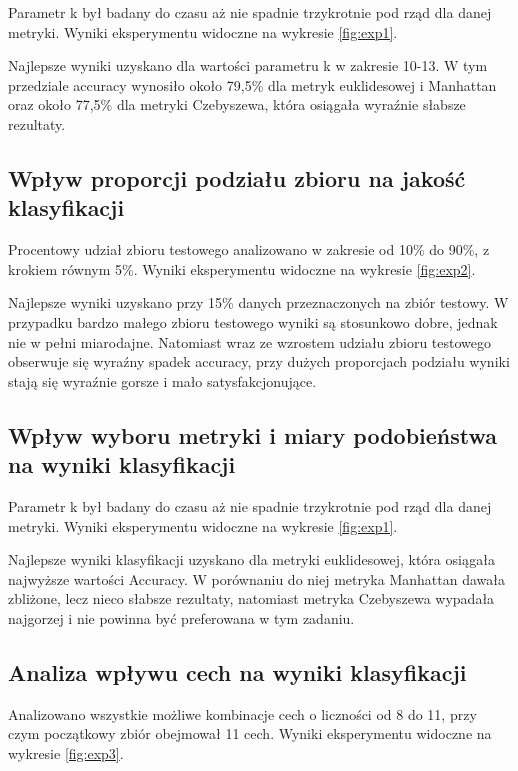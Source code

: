 \documentclass{article}
\begin{document}
	Parametr k był badany do czasu aż nie spadnie trzykrotnie pod rząd dla danej metryki.
	Wyniki eksperymentu widoczne na wykresie \ref{fig:exp1}.

	Najlepsze wyniki uzyskano dla wartości parametru k w zakresie 10-13. W tym przedziale accuracy wynosiło około 79,5\% dla metryk euklidesowej i Manhattan oraz około 77,5\% dla metryki Czebyszewa, która osiągała wyraźnie słabsze rezultaty.

	\subsection{Wpływ proporcji podziału zbioru na jakość klasyfikacji}

	Procentowy udział zbioru testowego analizowano w zakresie od 10\% do 90\%, z krokiem równym 5\%.
	Wyniki eksperymentu widoczne na wykresie \ref{fig:exp2}.

	Najlepsze wyniki uzyskano przy 15\% danych przeznaczonych na zbiór testowy. W przypadku bardzo małego zbioru testowego wyniki są stosunkowo dobre, jednak nie w pełni miarodajne. Natomiast wraz ze wzrostem udziału zbioru testowego obserwuje się wyraźny spadek accuracy, przy dużych proporcjach podziału wyniki stają się wyraźnie gorsze i mało satysfakcjonujące.

	\subsection{Wpływ wyboru metryki i miary podobieństwa na wyniki klasyfikacji}

	Parametr k był badany do czasu aż nie spadnie trzykrotnie pod rząd dla danej metryki.
	Wyniki eksperymentu widoczne na wykresie \ref{fig:exp1}.

	Najlepsze wyniki klasyfikacji uzyskano dla metryki euklidesowej, która osiągała najwyższe wartości Accuracy. W porównaniu do niej metryka Manhattan dawała zbliżone, lecz nieco słabsze rezultaty, natomiast metryka Czebyszewa wypadała najgorzej i nie powinna być preferowana w tym zadaniu.

	\subsection{Analiza wpływu cech na wyniki klasyfikacji}

	Analizowano wszystkie możliwe kombinacje cech o liczności od 8 do 11, przy czym początkowy zbiór obejmował 11 cech.
	Wyniki eksperymentu widoczne na wykresie \ref{fig:exp3}.
\end{document}
